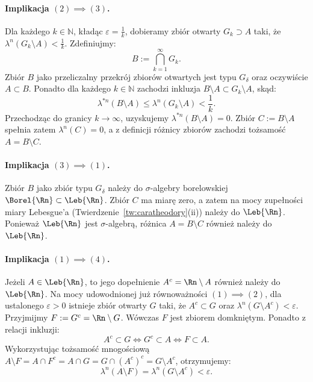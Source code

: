 \begin{dow}
    \paragraph{Implikacja $(2) \implies (3)$.}
    Dla każdego $k \in \mathbb{N}$, kładąc $\varepsilon = \frac{1}{k}$, dobieramy zbiór otwarty $G_k \supset A$ taki, że $\lambda^n(G_k \setminus A) < \frac{1}{k}$.
    Zdefiniujmy:
    \begin{equation*}
        B := \bigcap_{k=1}^\infty G_k.
    \end{equation*}
    Zbiór $B$ jako przeliczalny przekrój zbiorów otwartych jest typu $G_\delta$ oraz oczywiście $A \subset B$. Ponadto dla każdego $k \in \mathbb{N}$ zachodzi inkluzja $B \setminus A \subset G_k \setminus A$, skąd:
    \begin{equation*}
        \lambda^{*n}(B \setminus A) \le \lambda^n(G_k \setminus A) < \frac{1}{k}.
    \end{equation*}
    Przechodząc do granicy $k \to \infty$, uzyskujemy $\lambda^{*n}(B \setminus A) = 0$. Zbiór $C := B \setminus A$ spełnia zatem $\lambda^n(C) = 0$, a z definicji różnicy zbiorów zachodzi tożsamość $A = B \setminus C$.

    \paragraph{Implikacja $(3) \implies (1)$.}
    Zbiór $B$ jako zbiór typu $G_\delta$ należy do $\sigma$-algebry borelowskiej $\Borel{\Rn} \subset \Leb{\Rn}$. Zbiór $C$ ma miarę zero, a zatem na mocy zupełności miary Lebesgue'a (Twierdzenie~\ref{tw:caratheodory}(ii)) należy do $\Leb{\Rn}$. Ponieważ $\Leb{\Rn}$ jest $\sigma$-algebrą, różnica $A = B \setminus C$ również należy do $\Leb{\Rn}$.

    \paragraph{Implikacja $(1) \implies (4)$.}
    Jeżeli $A \in \Leb{\Rn}$, to jego dopełnienie $A^c = \Rn \setminus A$ również należy do $\Leb{\Rn}$. Na mocy udowodnionej już równoważności $(1) \implies (2)$, dla ustalonego $\varepsilon > 0$ istnieje zbiór otwarty $G$ taki, że $A^c \subset G$ oraz $\lambda^n(G \setminus A^c) < \varepsilon$.
    Przyjmijmy $F := G^c = \Rn \setminus G$. Wówczas $F$ jest zbiorem domkniętym. Ponadto z relacji inkluzji:
    \begin{equation*}
        A^c \subset G \iff G^c \subset A \iff F \subset A.
    \end{equation*}
    Wykorzystując tożsamość mnogościową $A \setminus F = A \cap F^c = A \cap G = G \cap (A^c)^c = G \setminus A^c$, otrzymujemy:
    \begin{equation*}
        \lambda^n(A \setminus F) = \lambda^n(G \setminus A^c) < \varepsilon.
    \end{equation*}


\end{dow}

